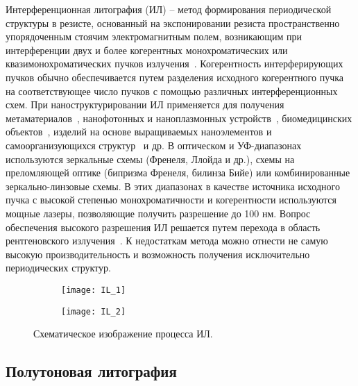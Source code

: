 Интерференционная литография (ИЛ) -- метод формирования периодической структуры в резисте, основанный на экспонировании резиста пространственно упорядоченным стоячим электромагнитным полем, возникающим при интерференции двух и более когерентных монохроматических или квазимонохроматических пучков излучения~\cite{IL_general}. Когерентность интерферирующих пучков обычно обеспечивается путем разделения исходного когерентного пучка на соответствующее число пучков с помощью различных интерференционных схем. При наноструктурировании ИЛ применяется для получения  метаматериалов~\cite{IL_metamaterials}, нанофотонных и наноплазмонных устройств~\cite{IL_nanophotonics}, биомедицинских объектов~\cite{IL_biomedical}, изделий на основе выращиваемых наноэлементов и самоорганизующихся структур~\cite{IL_self-assembly} и др.
В оптическом и УФ-диапазонах используются зеркальные схемы (Френеля, Ллойда и др.), схемы на преломляющей оптике (бипризма Френеля, билинза Бийе) или комбинированные зеркально-линзовые схемы. В этих диапазонах в качестве источника исходного пучка с высокой степенью монохроматичности и когерентности используются мощные лазеры, позволяющие получить разрешение до 100 нм. Вопрос обеспечения высокого разрешения ИЛ решается путем перехода в область рентгеновского излучения~\cite{IL_X-ray}. К недостаткам метода можно отнести не самую высокую производительность и возможность получения исключительно периодических структур.

\begin{figure}
	\centering
	\begin{subfigure}{.5\textwidth}
		\centering
		\texttt{[image: IL\_1]}
	\end{subfigure}%
	\begin{subfigure}{.5\textwidth}
		\centering
		\texttt{[image: IL\_2]}
	\end{subfigure}
	\caption{Схематическое изображение процесса ИЛ.}
\end{figure}


\subsection{Полутоновая литография}

